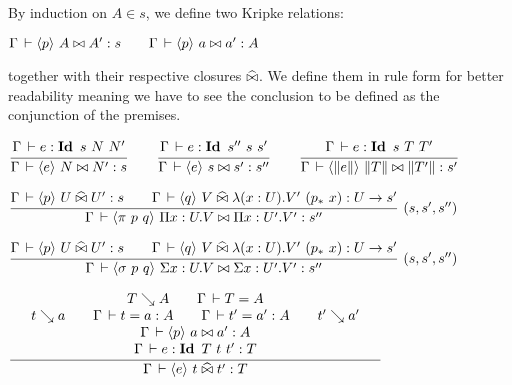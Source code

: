 \documentclass[a4paper,english]{lipics-utf8x}
\begin{document}
  By induction on $A \in s$, we define two Kripke relations:
  \begin{center}
  \(
    \Gamma \,\vdash \langle p \rangle~ A \mathrel{\bowtie} A' : s
    \qquad
    \Gamma \,\vdash \langle p \rangle~ a \mathrel{\bowtie} a' : A
  \)
  \end{center}
  together with their respective closures $\mathrel{\widehat{\bowtie}}$.
  We define them in rule form for better readability meaning we have to see the
  conclusion to be defined as the conjunction of the premises.

  \begin{mathc}
  \end{mathc}

  \begin{center}
  \(
    \ru{\Gamma \der e : \Id s\ N\ N'
      }{\Gamma \der \hideq{e} N \Er N' : s}
    \qquad
    \ru{\Gamma \der e : \Id s''\ s\ s'
      }{\Gamma \der \hideq{e} s \Er s' : s''}
    \qquad
    \ru{\Gamma \der e : \Id s\ T\ T'
      }{\Gamma \der \hideq{\squash{e}} \squash{T} \Er \squash{T'} : s'}
  \)
  \end{center}

  \begin{center}
  \(
    \rux{\Gamma \der \hideq{p} U \hEr U' : s \qquad
          \Gamma \der \hideq{q} V \hEr \lambda (x:U). V'\ (p_*\ x) : U \to s'
        }{\Gamma \der \hideq{\pi\ p\ q} \Pi x:U.V \Er \Pi x:U'.V' : s''
        }{(s,s',s'')}
  \)
  \end{center}

  \begin{center}
  \(
    \rux{\Gamma \der \hideq{p} U \hEr U' : s \qquad
         \Gamma \der \hideq{q} V \hEr \lambda (x:U). V'\ (p_*\ x) : U \to s'
       }{\Gamma \der \hideq{\sigma\ p\ q} \Sigma x:U.V \Er \Sigma x:U'.V' : s''
       }{(s,s',s'')}
  \)
  \end{center}

  \begin{mathc}
  \end{mathc}

  \begin{center}
  \(
    \qru{T \rew A \qquad
         \Gamma \der T = A
       }{t \rew a \qquad
         \Gamma \der t = a : A \qquad
         \Gamma \der t' = a' : A \qquad
         t' \rew a'
       }{\Gamma \der \hideq{p} a \Er a' : A
       }{\Gamma \der e : \Id T\ t\ t' : T
       }{\Gamma \der \hideq{e} t \hEr t' : T}
  \)
  \end{center}
\end{document}

